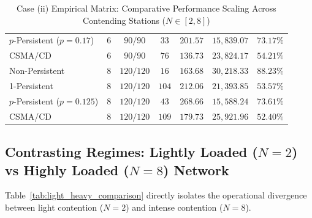 \documentclass[11pt,a4paper]{article}
\begin{document}
\begin{table}[htbp]
\begin{tabular}{l c c c c c c}
$p$-Persistent ($p=0.17$) & $6$ & $90 / 90$ & $33$ & $201.57$ & $15{,}839.07$ & $73.17\%$ \\
CSMA/CD & $6$ & $90 / 90$ & $76$ & $136.73$ & $23{,}824.17$ & $54.21\%$ \\
\hline
\rowcolor{lightgold} Non-Persistent & $8$ & $120 / 120$ & $16$ & $163.68$ & $30{,}218.33$ & $88.23\%$ \\
\rowcolor{lightgold} 1-Persistent & $8$ & $120 / 120$ & $104$ & $212.06$ & $21{,}393.85$ & $53.57\%$ \\
\rowcolor{lightgold} $p$-Persistent ($p=0.125$) & $8$ & $120 / 120$ & $43$ & $268.66$ & $15{,}588.24$ & $73.61\%$ \\
\rowcolor{lightgold} CSMA/CD & $8$ & $120 / 120$ & $109$ & $179.73$ & $25{,}921.96$ & $52.40\%$ \\
\bottomrule
\end{tabular}
\caption{Case (ii) Empirical Matrix: Comparative Performance Scaling Across Contending Stations ($N \in [2, 8]$)}
\label{tab:case_ii_data}
\end{table}

\subsection{Contrasting Regimes: Lightly Loaded ($N=2$) vs Highly Loaded ($N=8$) Network}
Table~\ref{tab:light_heavy_comparison} directly isolates the operational divergence between light contention ($N=2$) and intense contention ($N=8$).
\end{document}
